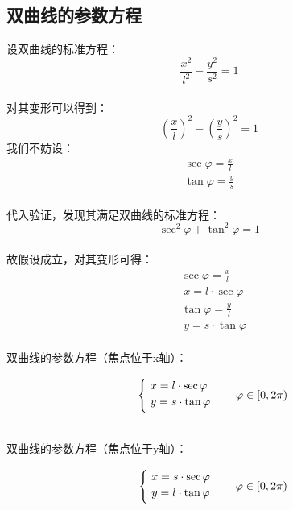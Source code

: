 \documentclass[UTF8]{ctexart}
\begin{document}
\newpage

\subsection{双曲线的参数方程}
    设双曲线的标准方程：
    \setcounter{equation}{0}
    \begin{equation}
        \frac{x^2}{l^2}-\frac{y^2}{s^2}=1
    \end{equation}\\
    对其变形可以得到：
    \begin{equation}
        \left(\frac{x}{l}\right)^2-\left(\frac{y}{s}\right)^2=1
    \end{equation}
    我们不妨设：
    \begin{align}
        \sec{\varphi}=\frac{x}{l}\\[4mm]
        \tan{\varphi}=\frac{y}{s}
    \end{align}\\
    代入验证，发现其满足双曲线的标准方程：
    \begin{equation}
        \sec^2{\varphi}+\tan^2{\varphi}=1
    \end{equation}\\
    故假设成立，对其变形可得：
    \begin{align}
        &\sec{\varphi}=\frac{x}{l}\\[3mm]
        &~x=l\cdot\sec{\varphi}\\[6mm]
        &\tan{\varphi}=\frac{y}{l}\\[3mm]
        &~y=s\cdot\tan{\varphi}
    \end{align}\\
    双曲线的参数方程（焦点位于x轴）：
    \begin{large}
        \begin{equation*}
            ~~~~\begin{cases}
                ~x=l\cdot\sec{\varphi}\\
                ~y=s\cdot\tan{\varphi}\vspace{3pt}
            \end{cases}\quad\varphi\in[0,2\pi)~~
        \end{equation*}
    \end{large}\\[1mm]
    双曲线的参数方程（焦点位于y轴）：
    \begin{large}
        \begin{equation*}
            ~~~~\begin{cases}
                ~x=s\cdot\sec{\varphi}\\
                ~y=l\cdot\tan{\varphi}\vspace{3pt}
            \end{cases}\quad\varphi\in[0,2\pi)~~
        \end{equation*}
    \end{large}\\
\end{document}
